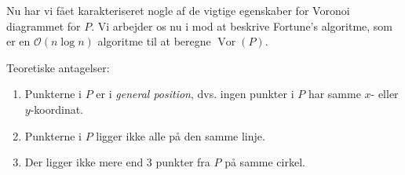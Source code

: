 \documentclass{beamer} %
\newcommand{\longpause}{\break \break \pause}
\DeclareMathOperator{\Vor}{Vor}
\begin{document}

\begin{frame}
\pause
Nu har vi fået karakteriseret nogle af de vigtige egenskaber for Voronoi diagrammet for $P$.
\longpause
Vi arbejder os nu i mod at beskrive Fortune's algoritme, som er en $\mathcal{O}(n \log n)$ algoritme til at beregne $\Vor(P)$.
\end{frame}

\begin{frame}
\pause
Teoretiske antagelser:
\begin{enumerate}
	\pause \item Punkterne i $P$ er i \textit{general position}, dvs. ingen punkter i $P$ har samme $x$- eller $y$-koordinat.
	\pause \item Punkterne i $P$ ligger ikke alle på den samme linje.
	\pause \item Der ligger ikke mere end 3 punkter fra $P$ på samme cirkel.
\end{enumerate}
\end{frame}
\end{document}
